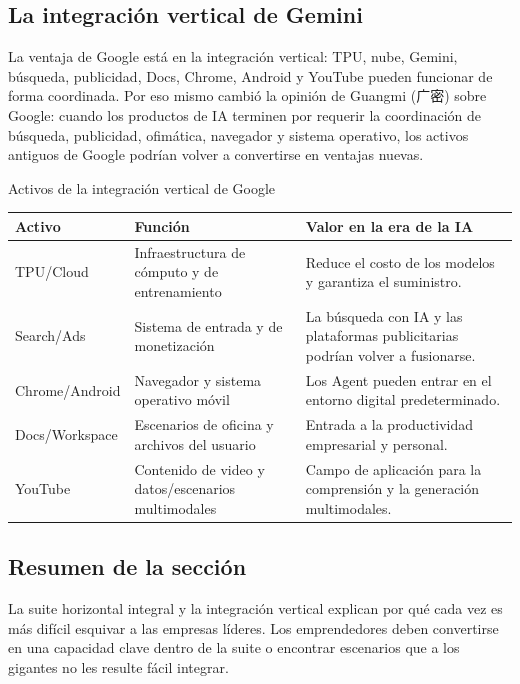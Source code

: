 \subsection{La integración vertical de Gemini}

La ventaja de Google está en la integración vertical: TPU, nube, Gemini, búsqueda, publicidad, Docs, Chrome, Android y YouTube pueden funcionar de forma coordinada. Por eso mismo cambió la opinión de Guangmi (广密) sobre Google: cuando los productos de IA terminen por requerir la coordinación de búsqueda, publicidad, ofimática, navegador y sistema operativo, los activos antiguos de Google podrían volver a convertirse en ventajas nuevas.

\begin{knowledgebox}{Activos de la integración vertical de Google}
\begin{tabularx}{\textwidth}{p{}p{}X}
\toprule
Activo & Función & Valor en la era de la IA \\
\midrule
TPU/Cloud & Infraestructura de cómputo y de entrenamiento & Reduce el costo de los modelos y garantiza el suministro. \\
Search/Ads & Sistema de entrada y de monetización & La búsqueda con IA y las plataformas publicitarias podrían volver a fusionarse. \\
Chrome/Android & Navegador y sistema operativo móvil & Los Agent pueden entrar en el entorno digital predeterminado. \\
Docs/Workspace & Escenarios de oficina y archivos del usuario & Entrada a la productividad empresarial y personal. \\
YouTube & Contenido de video y datos/escenarios multimodales & Campo de aplicación para la comprensión y la generación multimodales. \\
\bottomrule
\end{tabularx}
\end{knowledgebox}

\subsection{Resumen de la sección}

La suite horizontal integral y la integración vertical explican por qué cada vez es más difícil esquivar a las empresas líderes. Los emprendedores deben convertirse en una capacidad clave dentro de la suite o encontrar escenarios que a los gigantes no les resulte fácil integrar.
